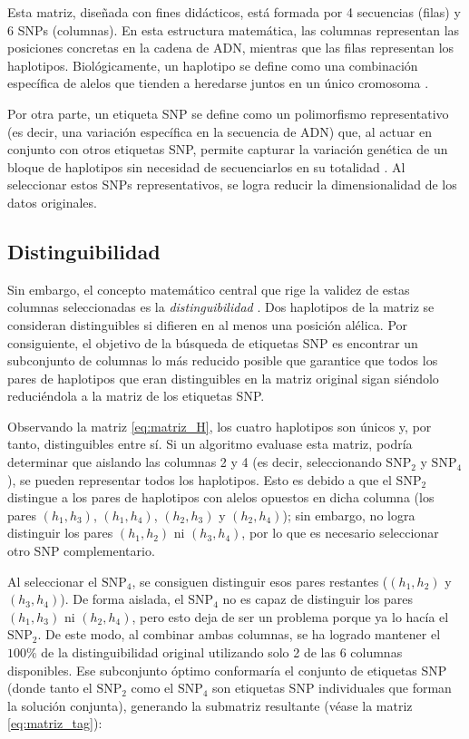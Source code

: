Esta matriz, diseñada con fines didácticos, está formada por 4 secuencias (filas) y 6 SNPs (columnas). En esta estructura matemática, las columnas representan las posiciones concretas en la cadena de ADN, mientras que las filas representan los haplotipos. Biológicamente, un haplotipo se define como una combinación específica de alelos que tienden a heredarse juntos en un único cromosoma \cite{bafna2003haplotypes}.

Por otra parte, un etiqueta SNP se define como un polimorfismo representativo (es decir, una variación específica en la secuencia de ADN) que, al actuar en conjunto con otros etiquetas SNP, permite capturar la variación genética de un bloque de haplotipos sin necesidad de secuenciarlos en su totalidad \cite{bafna2003haplotypes, ting2010multi}. Al seleccionar estos SNPs representativos, se logra reducir la dimensionalidad de los datos originales. 

\subsection{Distinguibilidad}
Sin embargo, el concepto matemático central que rige la validez de estas columnas seleccionadas es la \textit{distinguibilidad} \cite{bafna2003haplotypes}. Dos haplotipos de la matriz se consideran distinguibles si difieren en al menos una posición alélica. Por consiguiente, el objetivo de la búsqueda de etiquetas SNP es encontrar un subconjunto de columnas lo más reducido posible que garantice que todos los pares de haplotipos que eran distinguibles en la matriz original sigan siéndolo reduciéndola a la matriz de los etiquetas SNP.

Observando la matriz \ref{eq:matriz_H}, los cuatro haplotipos son únicos y, por tanto, distinguibles entre sí. Si un algoritmo evaluase esta matriz, podría determinar que aislando las columnas 2 y 4 (es decir, seleccionando $\text{SNP}_2$ y $\text{SNP}_4$), se pueden representar todos los haplotipos. Esto es debido a que el $\text{SNP}_2$ distingue a los pares de haplotipos con alelos opuestos en dicha columna (los pares $(h_1, h_3)$, $(h_1, h_4)$, $(h_2, h_3)$ y $(h_2, h_4)$); sin embargo, no logra distinguir los pares $(h_1, h_2)$ ni $(h_3, h_4)$, por lo que es necesario seleccionar otro SNP complementario.

Al seleccionar el $\text{SNP}_4$, se consiguen distinguir esos pares restantes ($(h_1, h_2)$ y $(h_3, h_4)$). De forma aislada, el $\text{SNP}_4$ no es capaz de distinguir los pares $(h_1, h_3)$ ni $(h_2, h_4)$, pero esto deja de ser un problema porque ya lo hacía el $\text{SNP}_2$. De este modo, al combinar ambas columnas, se ha logrado mantener el $100\%$ de la distinguibilidad original utilizando solo 2 de las 6 columnas disponibles. Ese subconjunto óptimo conformaría el conjunto de etiquetas SNP (donde tanto el $\text{SNP}_2$ como el $\text{SNP}_4$ son etiquetas SNP individuales que forman la solución conjunta), generando la submatriz resultante (véase la matriz \ref{eq:matriz_tag}):

